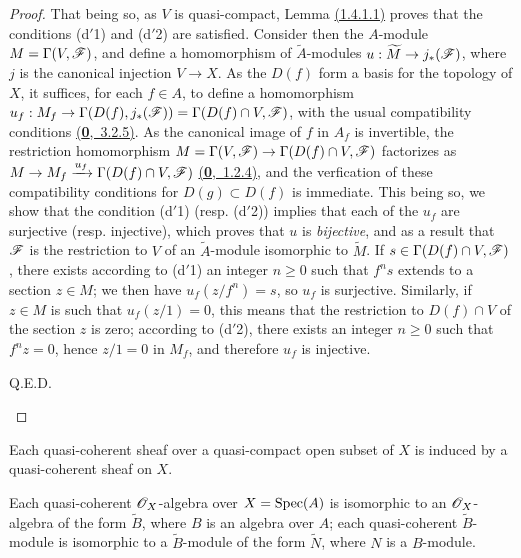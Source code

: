 \begin{proof}
That being so, as $V$ is quasi-compact, Lemma \hyperref[lem-1.1.4.1.1]{(1.4.1.1)} proves that
the conditions (d$'$1) and (d$'$2) are satisfied. Consider then the $A$-module
$M=\Gamma(V,\mathscr{F})$, and define a homomorphism of $\widetilde{A}$-modules
$u:\widetilde{M}\to j_*(\mathscr{F})$, where $j$ is the canonical injection $V\to X$. As the
$D(f)$ form a basis for the topology of $X$, it suffices, for each $f\in A$, to define a
homomorphism $u_f:M_f\to\Gamma(D(f),j_*(\mathscr{F}))=\Gamma(D(f)\cap V,\mathscr{F})$, with the usual
compatibility conditions \hyperref[env-0.3.2.5]{(\textbf{0},~3.2.5)}. As the canonical image of $f$ in $A_f$ is
invertible, the restriction homomorphism $M=\Gamma(V,\mathscr{F})\to\Gamma(D(f)\cap V,\mathscr{F})$
factorizes as $M\to M_f\xrightarrow{u_f}\Gamma(D(f)\cap V,\mathscr{F})$ \hyperref[env-0.1.2.4]{(\textbf{0},~1.2.4)}, and the
verfication of these compatibility conditions for $D(g)\subset D(f)$ is immediate. This being
so, we show that the condition (d$'$1) (resp. (d$'$2)) implies that each of the $u_f$ are
surjective (resp. injective), which proves that $u$ is {\it bijective}, and as a result that
$\mathscr{F}$ is the restriction to $V$ of an $\widetilde{A}$-module isomorphic to
$\widetilde{M}$. If $s\in\Gamma(D(f)\cap V,\mathscr{F})$, there exists according to (d$'$1) an
integer $n\geqslant 0$ such that $f^n s$ extends to a section $z\in M$; we then have
$u_f(z/f^n)=s$, so $u_f$ is surjective. Similarly, if $z\in M$ is such that $u_f(z/1)=0$,
this means that the restriction to $D(f)\cap V$ of the section $z$ is zero; according to
(d$'$2), there exists an integer $n\geqslant 0$ such that $f^n z=0$, hence $z/1=0$ in $M_f$,
and therefore $u_f$ is injective.
\begin{flushright}
Q.E.D.
\end{flushright}
\end{proof}

\begin{cor}[1.4.2]
\label{cor-1.1.4.2}
Each quasi-coherent sheaf over a quasi-compact open subset of $X$ is induced by a
quasi-coherent sheaf on $X$.
\end{cor}

\begin{cor}[1.4.3]
\label{cor-1.1.4.3}
Each quasi-coherent $\mathscr{O}_X$-algebra over $X={\mathop{\mathrm{Spec}}\nolimits}(A)$ is isomorphic to an $\mathscr{O}_X$-algebra of
the form $\widetilde{B}$, where $B$ is an algebra over $A$; each quasi-coherent
$\widetilde{B}$-module is isomorphic to a $\widetilde{B}$-module of the form $\widetilde{N}$,
where $N$ is a $B$-module.
\end{cor}

